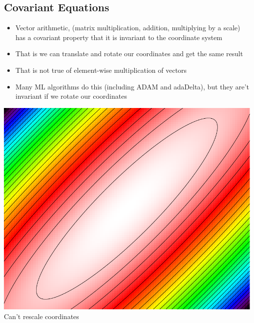 
\begin{slide}
\section[-2]{Covariant Equations}

\begin{PauseHighLight}
  \begin{minipage}{0.6\linewidth}
      \begin{itemize}
      \item Vector arithmetic, (matrix multiplication, addition,
        multiplying by a scale) has a covariant property that it is
        invariant to the coordinate system\pause
      \item That is we can translate and rotate our coordinates and get
        the same result\pause
      \item That is not true of element-wise multiplication of
        vectors\pause
      \item Many ML algorithms do this (including ADAM and adaDelta), but
        they are't invariant if we rotate our coordinates\pause
      \end{itemize}
    \end{minipage}\hfil
    \begin{minipage}{0.35\linewidth}
      \begin{center}
        \includegraphics[width=\linewidth]{correlatedWeights}\pauseb\\
        Can't rescale coordinates\pauseb
      \end{center}
    \end{minipage}
\end{PauseHighLight}

\end{slide}


